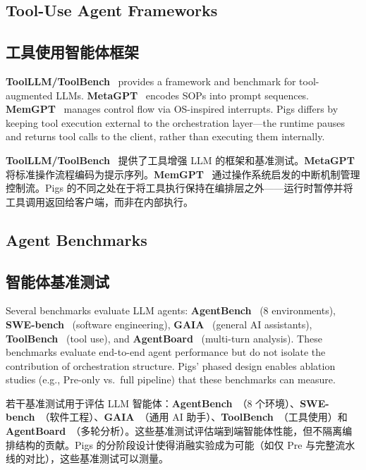 \subsection{Tool-Use Agent Frameworks}
\begin{chinese}
\subsection{工具使用智能体框架}
\end{chinese}

\textbf{ToolLLM/ToolBench}~\citep{qin2023toolllm} provides a framework and benchmark for tool-augmented LLMs. \textbf{MetaGPT}~\citep{hong2023metagpt} encodes SOPs into prompt sequences. \textbf{MemGPT}~\citep{packer2023memgpt} manages control flow via OS-inspired interrupts. Pigs differs by keeping tool execution external to the orchestration layer---the runtime pauses and returns tool calls to the client, rather than executing them internally.
\begin{chinese}
\textbf{ToolLLM/ToolBench}~\citep{qin2023toolllm} 提供了工具增强 LLM 的框架和基准测试。\textbf{MetaGPT}~\citep{hong2023metagpt} 将标准操作流程编码为提示序列。\textbf{MemGPT}~\citep{packer2023memgpt} 通过操作系统启发的中断机制管理控制流。Pigs 的不同之处在于将工具执行保持在编排层之外——运行时暂停并将工具调用返回给客户端，而非在内部执行。
\end{chinese}

\subsection{Agent Benchmarks}
\begin{chinese}
\subsection{智能体基准测试}
\end{chinese}

Several benchmarks evaluate LLM agents: \textbf{AgentBench}~\citep{liu2023agentbench} (8 environments), \textbf{SWE-bench}~\citep{jimenez2024swebench} (software engineering), \textbf{GAIA}~\citep{mialon2023gaia} (general AI assistants), \textbf{ToolBench}~\citep{qin2023toolllm} (tool use), and \textbf{AgentBoard}~\citep{ma2024agentboard} (multi-turn analysis). These benchmarks evaluate end-to-end agent performance but do not isolate the contribution of orchestration structure. Pigs' phased design enables ablation studies (e.g., Pre-only vs.\ full pipeline) that these benchmarks can measure.
\begin{chinese}
若干基准测试用于评估 LLM 智能体：\textbf{AgentBench}~\citep{liu2023agentbench}（8 个环境）、\textbf{SWE-bench}~\citep{jimenez2024swebench}（软件工程）、\textbf{GAIA}~\citep{mialon2023gaia}（通用 AI 助手）、\textbf{ToolBench}~\citep{qin2023toolllm}（工具使用）和 \textbf{AgentBoard}~\citep{ma2024agentboard}（多轮分析）。这些基准测试评估端到端智能体性能，但不隔离编排结构的贡献。Pigs 的分阶段设计使得消融实验成为可能（如仅 Pre 与完整流水线的对比），这些基准测试可以测量。
\end{chinese}

